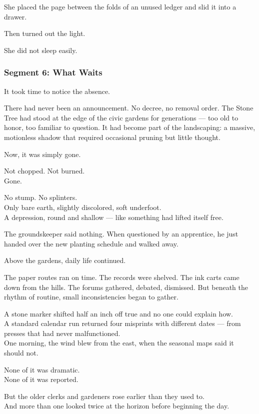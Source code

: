 \documentclass[9pt]{article}
\begin{document}
She placed the page between the folds of an unused ledger and slid it into a drawer.

Then turned out the light.

She did not sleep easily.

\newpage

\subsubsection*{Segment 6: What Waits}

It took time to notice the absence.

There had never been an announcement. No decree, no removal order. The Stone Tree had stood at the edge of the civic gardens for generations --- too old to honor, too familiar to question. It had become part of the landscaping: a massive, motionless shadow that required occasional pruning but little thought.

Now, it was simply gone.

Not chopped. Not burned.\\
Gone.

No stump. No splinters.\\
Only bare earth, slightly discolored, soft underfoot.\\
A depression, round and shallow --- like something had lifted itself free.

The groundskeeper said nothing. When questioned by an apprentice, he just handed over the new planting schedule and walked away.

\vspace{1em}

Above the gardens, daily life continued.

The paper routes ran on time. The records were shelved. The ink carts came down from the hills. The forums gathered, debated, dismissed. But beneath the rhythm of routine, small inconsistencies began to gather.

A stone marker shifted half an inch off true and no one could explain how.\\
A standard calendar run returned four misprints with different dates --- from presses that had never malfunctioned.\\
One morning, the wind blew from the east, when the seasonal maps said it should not.

None of it was dramatic.\\
None of it was reported.

But the older clerks and gardeners rose earlier than they used to.\\
And more than one looked twice at the horizon before beginning the day.
\end{document}
